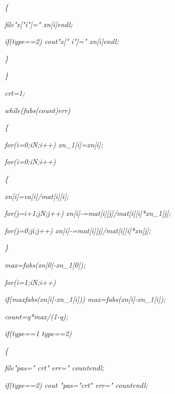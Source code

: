 \documentclass[a4paper,twoside]{book}
\begin{document}
\textit{\qquad \qquad \{}

\textit{\qquad \qquad \qquad file\TEXTsymbol{<}\TEXTsymbol{<}"x["\TEXTsymbol{%
<}\TEXTsymbol{<}i\TEXTsymbol{<}\TEXTsymbol{<}"]="\TEXTsymbol{<}\TEXTsymbol{<}%
xn[i]\TEXTsymbol{<}\TEXTsymbol{<}endl;}

\textit{\qquad \qquad \qquad if(type==2) cout\TEXTsymbol{<}\TEXTsymbol{<}"x["%
\TEXTsymbol{<}\TEXTsymbol{<}i\TEXTsymbol{<}\TEXTsymbol{<}"]="\TEXTsymbol{<}%
\TEXTsymbol{<}xn[i]\TEXTsymbol{<}\TEXTsymbol{<}endl;}

\textit{\qquad \qquad \}}

\textit{\qquad \}}

\textit{\qquad crt=1;}

\textit{\qquad while(fabs(count)\TEXTsymbol{>}err)}

\textit{\qquad \{}

\textit{\qquad \qquad for(i=0;i\TEXTsymbol{<}N;i++) xn\_1[i]=xn[i];}

\textit{\qquad \qquad for(i=0;i\TEXTsymbol{<}N;i++)}

\textit{\qquad \qquad \{}

\textit{\qquad \qquad \qquad xn[i]=va[i]/mat[i][i];}

\textit{\qquad \qquad \qquad for(j=i+1;j\TEXTsymbol{<}N;j++)
xn[i]-=mat[i][j]/mat[i][i]*xn\_1[j];}

\textit{\qquad \qquad \qquad for(j=0;j\TEXTsymbol{<}i;j++)
xn[i]-=mat[i][j]/mat[i][i]*xn[j];}

\textit{\qquad \qquad \}}

\textit{\qquad \qquad max=fabs(xn[0]-xn\_1[0]);}

\textit{\qquad \qquad for(i=1;i\TEXTsymbol{<}N;i++)}

\textit{\qquad \qquad \qquad if(max\TEXTsymbol{<}fabs(xn[i]-xn\_1[i]))
max=fabs(xn[i]-xn\_1[i]);}

\textit{\qquad \qquad count=q*max/(1-q);}

\textit{\qquad \qquad if(type==1 \TEXTsymbol{\vert}\TEXTsymbol{\vert}
type==2)}

\textit{\qquad \qquad \{}

\textit{\qquad \qquad \qquad file\TEXTsymbol{<}\TEXTsymbol{<}"pas="%
\TEXTsymbol{<}\TEXTsymbol{<}crt\TEXTsymbol{<}\TEXTsymbol{<}" err="%
\TEXTsymbol{<}\TEXTsymbol{<}count\TEXTsymbol{<}\TEXTsymbol{<}endl;}

\textit{\qquad \qquad \qquad if(type==2) cout\TEXTsymbol{<}\TEXTsymbol{<}%
"pas="\TEXTsymbol{<}\TEXTsymbol{<}crt\TEXTsymbol{<}\TEXTsymbol{<}" err="%
\TEXTsymbol{<}\TEXTsymbol{<}count\TEXTsymbol{<}\TEXTsymbol{<}endl;}
\end{document}
